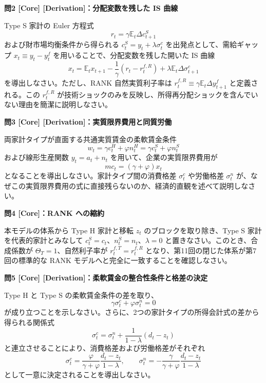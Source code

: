\documentclass[
  japanese,
  lualatex,
  ja=standard,
  12pt,
  a4paper]{ltjsarticle}
\begin{document}

\textbf{問2 {[}Core{]} {[}Derivation{]}：分配変数を残した IS 曲線}

Type S 家計の Euler 方程式 \[
r_t = \gamma \mathbb{E}_t \Delta c_{t+1}^S
\] および財市場均衡条件から得られる \(c_t^S = y_t + \lambda \sigma_t^c\)
を出発点として、需給ギャップ \(x_t \equiv y_t - y_t^f\)
を用いることで、分配変数を残した開いた IS 曲線 \[
x_t
=
\mathbb{E}_t x_{t+1}
-
\frac{1}{\gamma}(r_t - r_t^{f,R})
+
\lambda \mathbb{E}_t \Delta \sigma_{t+1}^c
\] を導出しなさい。ただし、RANK 自然実質利子率は
\(r_t^{f,R} \equiv \gamma \mathbb{E}_t \Delta y_{t+1}^f\)
と定義される。この \(r_t^{f,R}\)
が技術ショックのみを反映し、所得再分配ショックを含んでいない理由を簡潔に説明しなさい。


\textbf{問3 {[}Core{]} {[}Derivation{]}：実質限界費用と同質労働}

両家計タイプが直面する共通実質賃金の柔軟賃金条件 \[
w_t = \gamma c_t^H + \varphi n_t^H = \gamma c_t^S + \varphi n_t^S
\] および線形生産関数 \(y_t = a_t + n_t\) を用いて、企業の実質限界費用が
\[
mc_t = (\gamma+\varphi) x_t
\] となることを導出しなさい。家計タイプ間の消費格差 \(\sigma_t^c\)
や労働格差 \(\sigma_t^n\)
が、なぜこの実質限界費用の式に直接残らないのか、経済的直観を述べて説明しなさい。


\textbf{問4 {[}Core{]}：RANK への縮約}

本モデルの体系から Type H 家計と移転 \(z_t\) のブロックを取り除き、Type
S 家計を代表的家計とみなして
\(c_t^S = c_t\)、\(n_t^S = n_t\)、\(\lambda = 0\)
と置きなさい。このとき、合成係数が \(\Theta_T = 1\)、自然利子率が
\(r_t^{f,T} = r_t^{f,R}\) となり、第11回の閉じた体系が第7回の標準的な
RANK モデルへと完全に一致することを確認しなさい。


\textbf{問5 {[}Core{]}
{[}Derivation{]}：柔軟賃金の整合性条件と格差の決定}

Type H と Type S の柔軟賃金条件の差を取り、 \[
\gamma \sigma_t^c + \varphi \sigma_t^n = 0
\]
が成り立つことを示しなさい。さらに、2つの家計タイプの所得会計式の差から得られる関係式
\[
\sigma_t^c = \sigma_t^n + \frac{1}{1-\lambda}(d_t - z_t)
\] と連立させることにより、消費格差および労働格差がそれぞれ \[
\sigma_t^c = \frac{\varphi}{\gamma+\varphi} \frac{d_t - z_t}{1-\lambda},
\qquad
\sigma_t^n = -\frac{\gamma}{\gamma+\varphi} \frac{d_t - z_t}{1-\lambda}
\] として一意に決定されることを導出しなさい。
\end{document}
